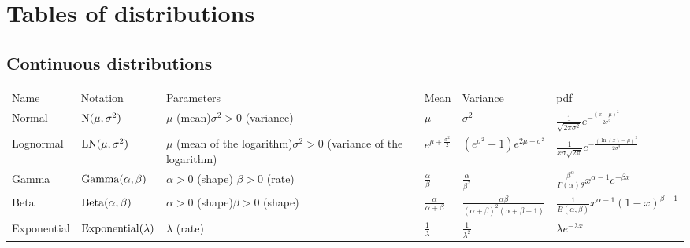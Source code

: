 \documentclass[thesis.tex]{subfiles}
\begin{document}
\chapter{Tables of distributions} \label{distributions}
\begin{landscape}
\section{Continuous distributions}
\begin{tabular}{llp{3.5cm}lll}
Name & Notation & Parameters & Mean & Variance & pdf\\
Normal & $\operatorname{N}(\mu, \sigma^2)$ & $\mu$ (mean)\newline $\sigma^2 > 0$ (variance) & $\mu$ & $\sigma^2$ & $\frac{1}{\sqrt{2\pi\sigma^2}}e^{-\frac{(x-\mu)^2}{2\sigma^2}}$ \\
Lognormal & $\operatorname{LN}(\mu, \sigma^2)$ & $\mu$ (mean of the logarithm)\newline $\sigma^2 > 0$ (variance of the logarithm) & $e^{\mu + \frac{\sigma^2}{2}}$ & $(e^{\sigma^2} - 1)e^{2\mu + \sigma^2}$ & $\frac{1}{x\sigma\sqrt{2\pi}}e^{-\frac{(\ln(x)-\mu)^2}{2\sigma^2}}$ \\
Gamma & $\operatorname{Gamma}(\alpha, \beta)$ & $\alpha > 0$ (shape) \newline $\beta > 0$ (rate) & $\frac{\alpha}{\beta}$ & $\frac{\alpha}{\beta^2}$ & $\frac{\beta^\alpha}{\Gamma(\alpha)\theta}x^{\alpha-1}e^{-\beta x}$ \\
Beta & $\operatorname{Beta}(\alpha, \beta)$ & $\alpha > 0$ (shape)\newline $\beta > 0$ (shape) & $\frac{\alpha}{\alpha+\beta}$ & $\frac{\alpha\beta}{(\alpha+\beta)^2(\alpha+\beta+1)}$ & $\frac{1}{B(\alpha,\beta)}x^{\alpha-1}(1-x)^{\beta-1}$ \\
Exponential & $\operatorname{Exponential}(\lambda)$ & $\lambda$ (rate) & $\frac{1}{\lambda}$ & $\frac{1}{\lambda^2}$ & $\lambda e^{-\lambda x}$ \\
\end{tabular}


\end{landscape}
\end{document}

